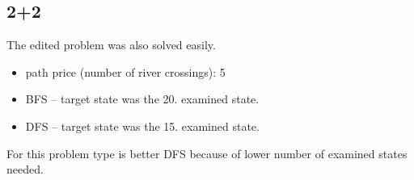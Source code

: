 \documentclass{article}
\begin{document}
\subsection{2+2}
The edited problem was also solved easily.
\begin{itemize}
\item path price (number of river crossings): 5
\item BFS -- target state was the 20. examined state.
\item DFS -- target state was the 15. examined state.
\end{itemize}
For this problem type is better DFS because of lower number of examined states needed.
\end{document}
